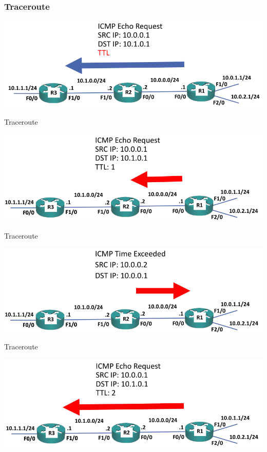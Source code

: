 \documentclass[pdflatex,compress,mathserif]{beamer}
\begin{document}
\begin{frame}
	\frametitle{Traceroute}
	\begin{center}
		\includegraphics[width=\linewidth]{img/img05}
	\end{center}
\end{frame}

\begin{frame}{Traceroute}
	\begin{center}
		\includegraphics[width=\linewidth]{img/img06}
	\end{center}
\end{frame}

\begin{frame}{Traceroute}
	\begin{center}
		\includegraphics[width=\linewidth]{img/img07}
	\end{center}
\end{frame}

\begin{frame}{Traceroute}
	\begin{center}
		\includegraphics[width=\linewidth]{img/img08}
	\end{center}
\end{frame}
\end{document}

